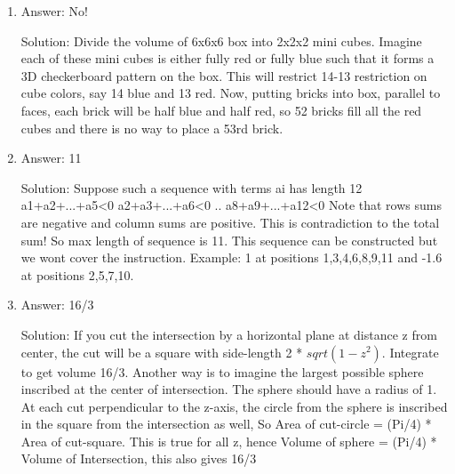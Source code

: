 \begin{enumerate}

\item
Answer: No!
 
Solution: Divide the volume of 6x6x6 box into 2x2x2 mini cubes. Imagine each of these mini cubes is either fully red or fully blue such that it forms a 3D checkerboard pattern on the box. This will restrict 14-13 restriction on cube colors, say 14 blue and 13 red. Now, putting bricks into box, parallel to faces, each brick will be half blue and half red, so 52 bricks fill all the red cubes and there is no way to place a 53rd brick.




\item
Answer: 11
 
Solution: Suppose such a sequence with terms {ai} has length 12
a1+a2+...+a5<0
a2+a3+...+a6<0
..
a8+a9+...+a12<0
Note that rows sums are negative and column sums are positive. This is contradiction to the total sum! So max length of sequence is 11. This sequence can be constructed but we wont cover the instruction. Example: 1 at positions 1,3,4,6,8,9,11 and -1.6 at positions 2,5,7,10.




\item
Answer: 16/3
 
Solution: If you cut the intersection by a horizontal plane at distance z from center, the cut will be a square with side-length 2 * $sqrt( 1-z^2)$. Integrate to get volume 16/3.
Another way is to imagine the largest possible sphere inscribed at the center of intersection. The sphere should have a radius of 1. At each cut perpendicular to the z-axis, the circle from the sphere is inscribed in the square from the intersection as well, So Area of cut-circle = (Pi/4) * Area of cut-square. This is true for all z, hence Volume of sphere = (Pi/4) * Volume of Intersection, this also gives 16/3





\end{enumerate}
